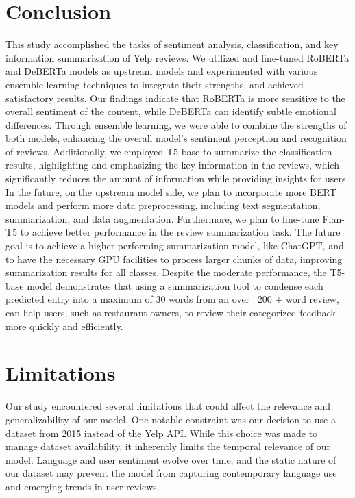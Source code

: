 \documentclass[11pt]{article}
\begin{document}
\section{Conclusion}
This study accomplished the tasks of sentiment analysis, classification, and key information summarization of Yelp reviews. We utilized and fine-tuned RoBERTa and DeBERTa models as upstream models and experimented with various ensemble learning techniques to integrate their strengths, and achieved satisfactory results. Our findings indicate that RoBERTa is more sensitive to the overall sentiment of the content, while DeBERTa can identify subtle emotional differences. Through ensemble learning, we were able to combine the strengths of both models, enhancing the overall model's sentiment perception and recognition of reviews. Additionally, we employed T5-base to summarize the classification results, highlighting and emphasizing the key information in the reviews, which significantly reduces the amount of information while providing insights for users. In the future, on the upstream model side, we plan to incorporate more BERT models and perform more data preprocessing, including text segmentation, summarization, and data augmentation. Furthermore, we plan to fine-tune Flan-T5 to achieve better performance in the review summarization task.
The future goal is to achieve a higher-performing summarization model, like ChatGPT, and to have the necessary GPU facilities to process larger chunks of data, improving summarization results for all classes. Despite the moderate performance, the T5-base model demonstrates that using a summarization tool to condense each predicted entry into a maximum of 30 words from an over ~200 + word review, can help users, such as restaurant owners, to review their categorized feedback more quickly and efficiently.

\section*{Limitations}
Our study encountered several limitations that could affect the relevance and generalizability of our model. One notable constraint was our decision to use a dataset from 2015 instead of the Yelp API. While this choice was made to manage dataset availability, it inherently limits the temporal relevance of our model. Language and user sentiment evolve over time, and the static nature of our dataset may prevent the model from capturing contemporary language use and emerging trends in user reviews.
\end{document}
